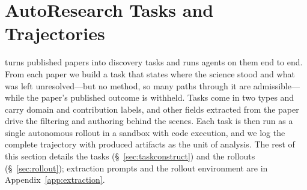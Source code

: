 %

\providecommand{\Set}{\mathbf{Set}}
\providecommand{\Lan}{\operatorname{Lan}}
\providecommand{\coel}[1]{\textstyle\int_{#1}}
\providecommand{\Kb}{\mathcal{K}}
\providecommand{\im}{\operatorname{im}}
\providecommand{\Prov}{\mathrm{Prov}}
\providecommand{\corpus}{\mathcal{C}}
\providecommand{\Tnov}{\mathcal{T}}
\providecommand{\Extract}{\mathcal{E}}
\providecommand{\Harn}{H}
\newtheorem{definition}{Definition}[section]


\section{AutoResearch Tasks and Trajectories}
\label{sec:benchmark}
\label{sec:construction}  %
\label{sec:principles}    %

\bench turns published papers into discovery tasks and runs agents on them end to end. From each
paper we build a task that states where the science stood and what was left unresolved---but no
method, so many paths through it are admissible---while the paper's published outcome is withheld. Tasks come in two types and carry domain and contribution labels, and other
fields extracted from the paper drive the filtering and authoring behind the scenes. Each task is
then run as a single autonomous rollout in a sandbox with code execution, and we log the complete
trajectory with produced artifacts as the unit of analysis. The rest of this section
details the tasks (\S~\ref{sec:taskconstruct}) and the rollouts (\S~\ref{sec:rollout}); extraction
prompts and the rollout environment are in Appendix~\ref{app:extraction}.

